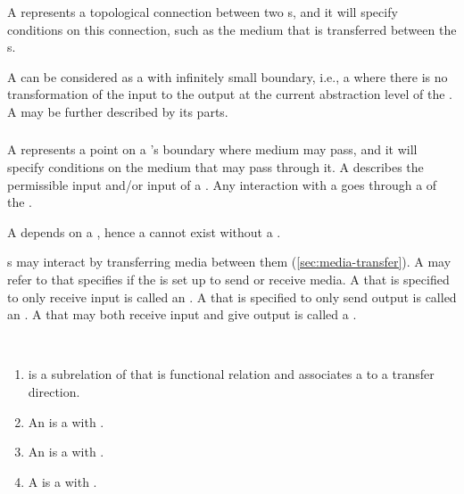 

\subsubsection{}

A  represents a topological connection between two
s, and it will specify conditions on this connection, such
as the medium that is transferred between the s.

A  can be considered as a  with infinitely small
boundary, i.e., a  where there is no transformation of
the input to the output at the current abstraction level of the
. A  may be further described by its
parts.

\subsubsection{}

A  represents a point on a 's boundary where
medium may pass, and it will specify conditions on the medium that may
pass through it.
%
A  describes the permissible input and/or input of
a .
%
Any interaction with a  goes through a  of the
.

A  depends on a , hence a  cannot
exist without a .


s may interact by transferring media between them (\autoref{sec:media-transfer}).
%
A  may refer to  that specifies if the
 is set up to send or receive media.
%
A  that is specified to only receive input is called an .
A  that is specified to only send output is called an .
A  that may both receive input and give output is called a .

\begin{axioms}~
  \begin{enumerate}[resume=axioms,{label=(\arabic*)}]
  \item {} is a subrelation of  that is functional relation and associates a  to a
    transfer direction.
  \item An  is a  with  .
  \item An  is a  with  .
  \item A  is a  with  .
  \end{enumerate}
\end{axioms}

